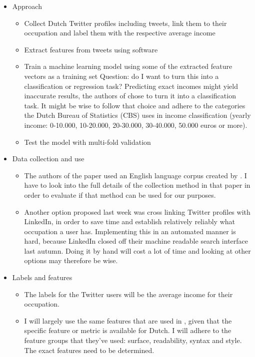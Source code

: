 \documentclass[11pt, a4paper]{article}
\begin{document}
\begin{itemize}
\item Approach
\begin{itemize}
\item Collect Dutch Twitter profiles including tweets, link them to their occupation and label them with the respective average income
\item Extract features from tweets using software
\item Train a machine learning model using some of the extracted feature vectors as a training set
\subitem Question: do I want to turn this into a classification or regression task? Predicting exact incomes might yield inaccurate results, the authors of  \cite{flekova} chose to turn it into a classification task. It might be wise to follow that choice and adhere to the categories the Dutch Bureau of Statistics (CBS) uses in income classification (yearly income: 0-10.000, 10-20.000, 20-30.000, 30-40.000, 50.000 euros or more).
\item Test the model with multi-fold validation
\end{itemize}

\item Data collection and use
\begin{itemize}
\item The authors of the paper used an English language corpus created by \cite{pietroA7}. I have to look into the full details of the collection method in that paper in order to evaluate if that method can be used for our purposes.
\item Another option proposed last week was cross linking Twitter profiles with LinkedIn, in order to save time and establish relatively reliably what occupation a user has. Implementing this in an automated manner is hard, because LinkedIn closed off their machine readable search interface last autumn. Doing it by hand will cost a lot of time and looking at other options may therefore be wise.
\end{itemize}

\item Labels and features
\begin{itemize}
\item The labels for the Twitter users will be the average income for their occupation.
\item I will largely use the same features that are used in \cite{flekova}, given that the specific feature or metric is available for Dutch. I will adhere to the feature groups that they've used: surface, readability, syntax and style. The exact features need to be determined.
\end{itemize}


\end{itemize}
\end{document}
